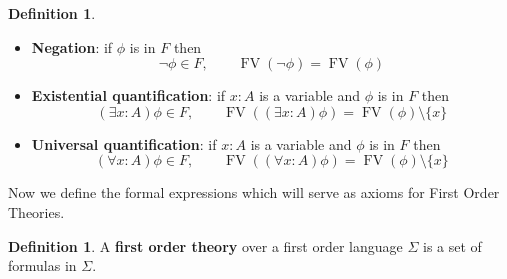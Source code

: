 \documentclass[12pt]{article}
\theoremstyle{plain}
\theoremstyle{definition}
\newtheorem{defn}[thm]{Definition} %
\begin{document}
\begin{defn}
\begin{itemize}
			\item \textbf{Negation}: if $\phi$ is in $F$ then
			\begin{equation}
				\neg \phi \in F,\qquad \operatorname{FV}(\neg \phi) = \operatorname{FV}(\phi)
			\end{equation}
			\item \textbf{Existential quantification}: if $x:A$ is a variable and $\phi$ is in $F$ then
			\begin{equation}
				(\exists x:A) \phi \in F,\qquad \operatorname{FV}((\exists x:A) \phi) = \operatorname{FV}(\phi)\setminus\lbrace x\rbrace
			\end{equation}
			\item \textbf{Universal quantification}: if $x:A$ is a variable and $\phi$ is in $F$ then
			\begin{equation}
				(\forall x:A) \phi \in F,\qquad \operatorname{FV}((\forall x:A) \phi) = \operatorname{FV}(\phi)\setminus\lbrace x\rbrace
			\end{equation}
		\end{itemize}
	\end{defn}
	Now we define the formal expressions which will serve as axioms for First Order Theories.
	
	
	\begin{defn}
		A \textbf{first order theory} over a first order language $\Sigma$ is a set of formulas in $\Sigma$.
	\end{defn}
	
\end{document}
